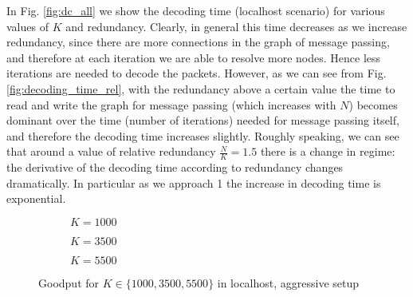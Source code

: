 In Fig. \ref{fig:dc_all} we show the decoding time (localhost scenario) for various values of $K$ and redundancy. Clearly, in general this time decreases as we increase redundancy, since there are more connections in the graph of message passing, and therefore at each iteration we are able to resolve more nodes. Hence less iterations are needed to decode the packets. However, as we can see from Fig.\ref{fig:decoding_time_rel}, with the redundancy above a certain value the time to read and write the graph for message passing (which increases with $N$) becomes dominant over the time (number of iterations) needed for message passing itself, and therefore the decoding time increases slightly. Roughly speaking, we can see that around a value of relative redundancy $\frac{N}{K}=1.5$ there is a change in regime: the derivative of the decoding time according to redundancy changes dramatically. In particular as we approach 1 the increase in decoding time is exponential.\\

\begin{figure}[t!]
\centering
\begin{subfigure}{0.24\textwidth}
	\captionsetup{justification=centering,font=scriptsize}
	\centering
	\setlength\fwidth{\textwidth}
	\setlength{}
	
	\caption{$K=1000$}
	\label{fig:lh_good_1000}
\end{subfigure}\hspace{2em}%
\begin{subfigure}{0.23\textwidth}
	\captionsetup{justification=centering,font=scriptsize}
	\centering
	\setlength\fwidth{\textwidth}
	\setlength{}
	
	\caption{$K=3500$}
	\label{fig:lh_good_3500}
\end{subfigure}\hspace{2em}%
\begin{subfigure}{0.23\textwidth}
	\captionsetup{justification=centering,font=scriptsize}
	\centering
	\setlength\fwidth{\textwidth}
	\setlength{}
	
	\caption{$K=5500$}
	\label{fig:lh_good_5500}
\end{subfigure}
\caption{Goodput for $K \in \{1000, 3500, 5500\}$ in localhost, aggressive setup}
\label{fig:goodput_aggr}
\end{figure}

